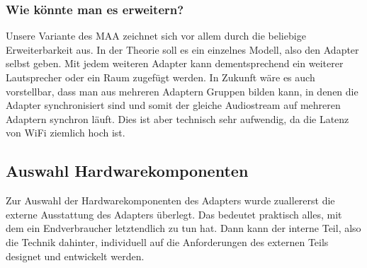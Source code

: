 \documentclass[11pt, twoside]{article}
\begin{document}
\subsubsection{Wie könnte man es erweitern?}
Unsere Variante des MAA zeichnet sich vor allem durch die beliebige Erweiterbarkeit aus. In der Theorie soll es ein einzelnes Modell, also den Adapter selbst geben. Mit jedem weiteren Adapter kann dementsprechend ein weiterer Lautsprecher oder ein Raum zugefügt werden. In Zukunft wäre es auch vorstellbar, dass man aus mehreren Adaptern Gruppen bilden kann, in denen die Adapter synchronisiert sind und somit der gleiche Audiostream auf mehreren Adaptern synchron läuft. Dies ist aber technisch sehr aufwendig, da die Latenz von WiFi ziemlich hoch ist.
\subsection{Auswahl Hardwarekomponenten}
Zur Auswahl der Hardwarekomponenten des Adapters wurde zuallererst die externe Ausstattung des Adapters überlegt. Das bedeutet praktisch alles, mit dem ein Endverbraucher letztendlich zu tun hat. Dann kann der interne Teil, also die Technik dahinter, individuell auf die Anforderungen des externen Teils designet und entwickelt werden.
\end{document}
